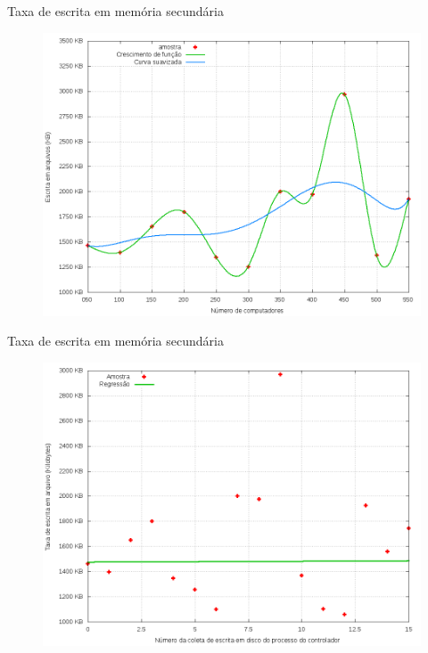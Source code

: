 \begin{frame}{Taxa de escrita em memória secundária}

    \begin{figure}[!htb]
        \centering
        \includegraphics[scale=.35]{images/writing-rate-growth}
    \end{figure}
\end{frame}



\begin{frame}{Taxa de escrita em memória secundária}

    \begin{figure}[!htb]
        \centering
        \includegraphics[scale=.35]{images/scatter-writing-rate}
    \end{figure}
\end{frame}


